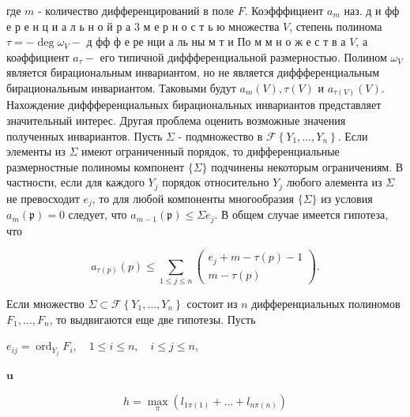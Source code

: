 \documentclass[10pt]{article}
\begin{document}
где $m$ - количество дифференцирований в поле $F$. Коэфффициент $a_{m}$ наз. д и фф е р е н ц и а л ь н о й р а 3 м е р н о с т ь ю множества $V$, степень полинома $\tau=-\operatorname{deg} \omega_{V}-$ д фф ф е ре нци а ль ны м т и По м м н о ж е с т в а $V$, а коәффициент $a_{\tau}-$ его типичной диффференциальной размерностью. Полином $\omega_{V}$ является бирациональным инвариантом, но не является диффференциальным бирациональным инвариантом. Таковыми будут $a_{m}(V), \tau(V)$ и $a_{\tau(V)}(V)$. Нахождение диффференциальных бирациональных инвариантов представляет значительный интерес. Другая проблема оценить возможные значения полученных инвариантов. Пусть $\Sigma$ - подмножество в $\mathscr{F}\left\{Y_{1}, \ldots, Y_{n}\right\}$. Если элементы из $\Sigma$ имеют ограниченный порядок, то дифференциальные размерностные полиномы компонент $\{\Sigma\}$ подчинены некоторым ограничениям. В частности, если для каждого $Y_{j}$ порядок относительно $Y_{j}$ любого әлемента из $\Sigma$ не превосходит $e_{j}$, то для любой компоненты многообразия $\{\Sigma\}$ из условия $a_{m}(\mathfrak{p})=0$ следует, что $a_{m-1}(\mathfrak{p}) \leqslant \Sigma e_{j}$. В общем случае имеется гипотеза, что



\[

a_{\tau(p)}(p) \leqslant \sum_{1 \leqslant j \leqslant n}\left(\begin{array}{c}

e_{j}+m-\tau(p)-1 \\

m-\tau(p)

\end{array}\right) .

\]



Если множество $\Sigma \subset \mathscr{F}\left\{Y_{1}, \ldots, Y_{n}\right\}$ состоит из $n$ дифференциальных полиномов $F_{1}, \ldots, F_{n}$, то выдвигаются еще две гипотезы. Пусть



$e_{i j}=\operatorname{ord}_{Y_{j}} F_{i}, \quad 1 \leqslant i \leqslant n, \quad i \leqslant j \leqslant n$,



$\mathbf{u}$



\[

h=\max _{\pi}\left(l_{1 \pi(1)}+\ldots+l_{n \pi(n)}\right)

\]
\end{document}
